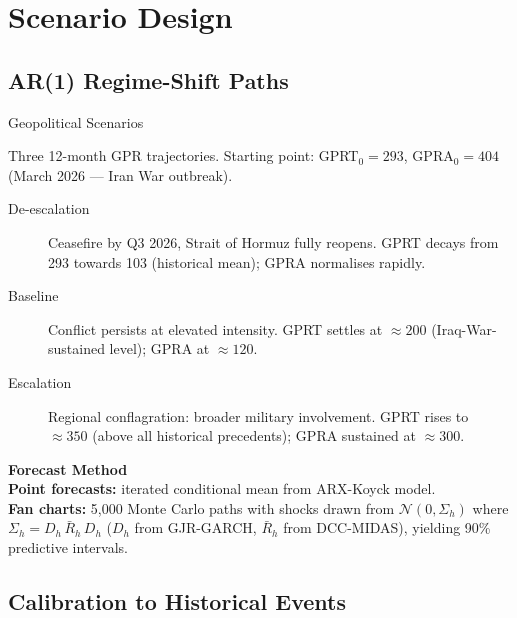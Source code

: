 ﻿\documentclass[aspectratio=1610]{beamer}
\begin{document}
\section{Scenario Design}

\subsection{AR(1) Regime-Shift Paths}

\begin{frame}[shrink=10]{Geopolitical Scenarios}

  Three 12-month GPR trajectories. Starting point: GPRT$_0 = 293$,
  GPRA$_0 = 404$ (March 2026 --- Iran War outbreak).

  \smallskip

  \begin{description}
    \item[De-escalation] Ceasefire by Q3 2026, Strait of Hormuz fully reopens.
      GPRT decays from 293 towards 103 (historical mean);
      GPRA normalises rapidly.
    \item[Baseline] Conflict persists at elevated intensity.
      GPRT settles at $\approx 200$ (Iraq-War-sustained level);
      GPRA at $\approx 120$.
    \item[Escalation] Regional conflagration: broader military involvement.
      GPRT rises to $\approx 350$ (above all historical precedents);
      GPRA sustained at $\approx 300$.
  \end{description}

  \smallskip

  \textbf{Forecast Method}\\[4pt]
  \textbf{Point forecasts:} iterated conditional mean from ARX-Koyck model.\\
  \textbf{Fan charts:} 5{,}000 Monte Carlo paths with shocks drawn from
  $\mathcal{N}(0, \Sigma_h)$ where $\Sigma_h = D_h\,\bar{R}_h\,D_h$
  ($D_h$ from GJR-GARCH, $\bar{R}_h$ from DCC-MIDAS), yielding 90\%
  predictive intervals.

\end{frame}

\subsection{Calibration to Historical Events}
\end{document}
